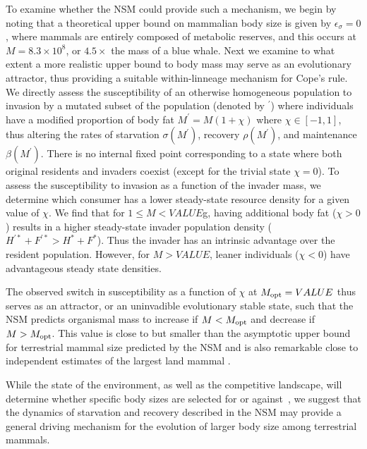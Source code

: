 \documentclass{pnastwo}
\newcommand{\sid}[1]{\textcolor{red}{\bf [#1]}}
\begin{document}
\begin{article}
{To examine whether the NSM could provide such a mechanism, we begin by noting that a theoretical upper bound on mammalian body size is given by $\epsilon_\sigma=0$, where mammals are entirely composed of metabolic reserves, and this occurs at $M=8.3\times 10^8$, or $4.5\times$ the mass of a blue whale.
Next we examine to what extent a more realistic upper bound to body mass may serve as an evolutionary attractor, thus providing a suitable within-linneage mechanism for Cope's rule.
We directly assess the susceptibility of an otherwise homogeneous population to invasion by a mutated subset of the population (denoted by ${}^\prime$) where individuals have a modified proportion of body fat $M^\prime=M(1+\chi)$ where $\chi \in [-1,1]$, thus altering the rates of starvation $\sigma(M^\prime)$, recovery $\rho(M^\prime)$, and maintenance $\beta(M^\prime)$.
There is no internal fixed point corresponding to a state where both original residents and invaders coexist (except for the trivial state $\chi=0$).
To assess the susceptibility to invasion as a function of the invader mass, we determine which consumer has a lower steady-state resource density for a given value of $\chi$.
We find that for $1\leq M<VALUE$g, having additional body fat ($\chi > 0$) results in a higher steady-state invader population density ($H^{\prime *}+F^{\prime *}>H^*+F^*$).
Thus the invader has an intrinsic advantage over the resident population.
However, for $M>VALUE$, leaner individuals ($\chi < 0$) have advantageous steady state densities.


The observed switch in susceptibility as a function of $\chi$ at $M_{\rm opt}=VALUE$ thus serves as an attractor, or an uninvadible evolutionary stable state, such that the NSM predicts organismal mass to increase if $M<M_{\rm opt}$ and decrease if $M>M_{\rm opt}$. This value is close to but smaller than the asymptotic upper bound for terrestrial mammal size predicted by the NSM and is also remarkable close to independent estimates of the largest land mammal \cite{Alroy:1998p1594,Clauset:2009fh}.
}


While the state of the environment, as well as the competitive landscape, will determine whether specific body sizes are selected for or against~\cite{Saarinen:2014br}, we suggest that the dynamics of starvation and recovery described in the NSM may provide a general driving mechanism for the evolution of larger body size among terrestrial mammals.



\end{article}
\end{document}
